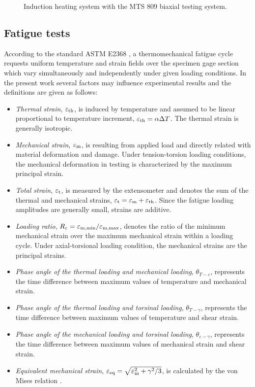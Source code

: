 \documentclass[preprint,5p,twocolumn,11pt,sort&compress]{elsarticle}
\begin{document}
\begin{figure}[!htp]
\caption{Induction heating system with the MTS 809 biaxial testing system.}
\label{Fig:Equipments}
\end{figure}

\subsection{Fatigue tests}
According to the standard ASTM E2368 \cite{ASTM2014a}, a thermomechanical fatigue cycle requests uniform temperature and strain fields over the specimen gage section which vary simultaneously and independently under given loading conditions. In the present work several factors may influence experimental results and the definitions are given as follows:
\begin{itemize}
  \item {\em Thermal strain}, $\varepsilon_{\rm th}$, is induced by temperature and assumed to be linear proportional to temperature increment, $\varepsilon_{\rm th}=\alpha \Delta T$. The thermal strain is generally isotropic.
  \item {\em Mechanical strain}, $\varepsilon_{\rm m}$, is resulting from applied load and directly related with material deformation and damage. Under tension-torsion loading conditions, the mechanical deformation in testing is characterized by the maximum principal strain.
  \item {\em Total strain}, $\varepsilon_{\rm t}$, is measured by the extensometer and denotes the sum of the thermal and mechanical strains, $\varepsilon_{\rm t}=\varepsilon_{\rm m}+\varepsilon_{\rm th}$. Since the fatigue loading amplitudes are generally small, strains are additive.
  \item {\em Loading ratio}, $R_{\varepsilon}=\varepsilon_{\rm m,\min}/\varepsilon_{\rm m,\max}$, denotes the ratio of the minimum mechanical strain over the maximum mechanical strain within a loading cycle. Under axial-torsional loading condition, the mechanical strains are the principal strains.
  \item {\em Phase angle of the thermal loading and mechanical loading}, $\theta_{T-\varepsilon}$, represents the time difference between maximum values of temperature and mechanical strain. %
  \item {\em Phase angle of the thermal loading and torsinal loading}, $\theta_{T-\gamma}$, represents the time difference between maximum values of temperature and shear strain.
  \item {\em Phase angle of the mechanical loading and torsinal loading}, $\theta_{\varepsilon-\gamma}$, represents the time difference between maximum values of mechanical strain and shear strain.
  \item {\em Equivalent mechanical strain}, $\varepsilon_{\rm eq}=\sqrt {\varepsilon _{\rm m}^2 + {\gamma ^2}/3}$, is calculated by the von Mises relation \cite{Pol1991Cyclic}.
\end{itemize}
\end{document}
